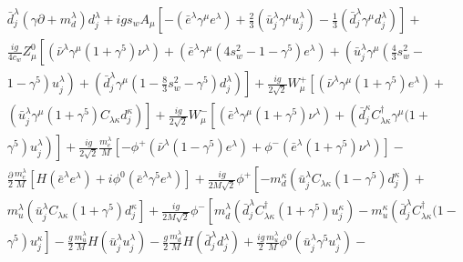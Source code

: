 \documentclass[lang=cn,newtx,10pt,scheme=chinese,thmcnt=section]{elegantbook}
\begin{document}
\begin{equation}
\begin{aligned}
		&\bar{d}_{j}^{\lambda}\left(\gamma \partial+m_{d}^{\lambda}\right) d_{j}^{\lambda}+i g s_{w} A_{\mu}\left[-\left(\bar{e}^{\lambda} \gamma^{\mu} e^{\lambda}\right)+\frac{2}{3}\left(\bar{u}_{j}^{\lambda} \gamma^{\mu} u_{j}^{\lambda}\right)-\frac{1}{3}\left(\bar{d}_{j}^{\lambda} \gamma^{\mu} d_{j}^{\lambda}\right)\right]+\\
		&\frac{i g}{4 c_{w}} Z_{\mu}^{0}\left[\left(\bar{\nu}^{\lambda} \gamma^{\mu}\left(1+\gamma^{5}\right) \nu^{\lambda}\right)+\left(\bar{e}^{\lambda} \gamma^{\mu}\left(4 s_{w}^{2}-1-\gamma^{5}\right) e^{\lambda}\right)+\left(\bar{u}_{j}^{\lambda} \gamma^{\mu}\left(\frac{4}{3} s_{w}^{2}-\right.\right.\right.\\
		&\left.\left.\left.1-\gamma^{5}\right) u_{j}^{\lambda}\right)+\left(\bar{d}_{j}^{\lambda} \gamma^{\mu}\left(1-\frac{8}{3} s_{w}^{2}-\gamma^{5}\right) d_{j}^{\lambda}\right)\right]+\frac{i g}{2 \sqrt{2}} W_{\mu}^{+}\left[\left(\bar{\nu}^{\lambda} \gamma^{\mu}\left(1+\gamma^{5}\right) e^{\lambda}\right)+\right.\\
		&\left.\left(\bar{u}_{j}^{\lambda} \gamma^{\mu}\left(1+\gamma^{5}\right) C_{\lambda \kappa} d_{j}^{\kappa}\right)\right]+\frac{i g}{2 \sqrt{2}} W_{\mu}^{-}\left[\left(\bar{e}^{\lambda} \gamma^{\mu}\left(1+\gamma^{5}\right) \nu^{\lambda}\right)+\left(\bar{d}_{j}^{\kappa} C_{\lambda \kappa}^{\dagger} \gamma^{\mu}(1+\right.\right.\\
		&\left.\left.\left.\gamma^{5}\right) u_{j}^{\lambda}\right)\right]+\frac{i g}{2 \sqrt{2}} \frac{m_{e}^{\lambda}}{M}\left[-\phi^{+}\left(\bar{\nu}^{\lambda}\left(1-\gamma^{5}\right) e^{\lambda}\right)+\phi^{-}\left(\bar{e}^{\lambda}\left(1+\gamma^{5}\right) \nu^{\lambda}\right)\right]-\\
		&\frac{\partial}{2} \frac{m_{e}^{\lambda}}{M}\left[H\left(\bar{e}^{\lambda} e^{\lambda}\right)+i \phi^{0}\left(\bar{e}^{\lambda} \gamma^{5} e^{\lambda}\right)\right]+\frac{i g}{2 M \sqrt{2}} \phi^{+}\left[-m_{d}^{\kappa}\left(\bar{u}_{j}^{\lambda} C_{\lambda \kappa}\left(1-\gamma^{5}\right) d_{j}^{\kappa}\right)+\right.\\
		&m_{u}^{\lambda}\left(\bar{u}_{j}^{\lambda} C_{\lambda \kappa}\left(1+\gamma^{5}\right) d_{j}^{\kappa}\right]+\frac{i g}{2 M \sqrt{2}} \phi^{-}\left[m_{d}^{\lambda}\left(\bar{d}_{j}^{\lambda} C_{\lambda \kappa}^{\dagger}\left(1+\gamma^{5}\right) u_{j}^{\kappa}\right)-m_{u}^{\kappa}\left(\bar{d}_{j}^{\lambda} C_{\lambda \kappa}^{\dagger}(1-\right.\right.\\
		&\left.\left.\gamma^{5}\right) u_{j}^{\kappa}\right]-\frac{g}{2} \frac{m_{u}^{\lambda}}{M} H\left(\bar{u}_{j}^{\lambda} u_{j}^{\lambda}\right)-\frac{g}{2} \frac{m_{d}^{\lambda}}{M} H\left(\bar{d}_{j}^{\lambda} d_{j}^{\lambda}\right)+\frac{i g}{2} \frac{m_{u}^{\lambda}}{M} \phi^{0}\left(\bar{u}_{j}^{\lambda} \gamma^{5} u_{j}^{\lambda}\right)-\\

\end{aligned}
\end{equation}
\end{document}
